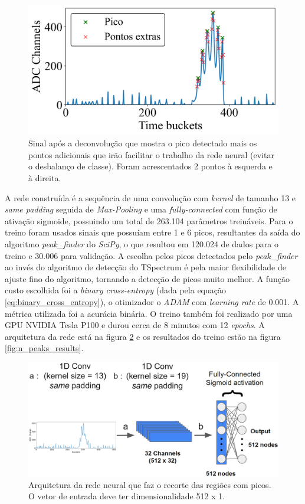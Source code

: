 \documentclass[a4paper,12pt,oneside]{book}
\begin{document}
\begin{figure}[H]
    \centering
    \includegraphics[scale = 0.6]{figs/np_ex1.png}
    \caption{Sinal após a deconvolução que mostra o pico detectado mais os pontos adicionais que irão facilitar o trabalho da rede neural (evitar o desbalanço de classe). Foram acrescentados 2 pontos à esquerda e à direita.}
    \label{fig:n_peaks_exs}
\end{figure}

\par A rede construída é a sequência de uma convolução com \textit{kernel} de tamanho 13 e \textit{same padding} seguida de \textit{Max-Pooling} e uma \textit{fully-connected} com função de ativação sigmoide, possuindo um total de 263.104 parâmetros treináveis. Para o treino foram usados sinais que possuíam entre 1 e 6 picos, resultantes da saída do algoritmo \textit{peak\_finder} do \textit{SciPy}, o que resultou em 120.024 de dados para o treino e 30.006 para validação. A escolha pelos picos detectados pelo \textit{peak\_finder} ao invés do algoritmo de detecção do TSpectrum é pela maior flexibilidade de ajuste fino do algoritmo, tornando a detecção de picos muito melhor\cite{FORTINO2022166497}. A função custo escolhida foi a \textit{binary cross-entropy} (dada pela equação \ref{eq:binary_cross_entropy}), o otimizador o \textit{ADAM} com \textit{learning rate} de 0.001. A métrica utilizada foi a acurácia binária. O treino também foi realizado por uma GPU NVIDIA Tesla P100 e durou cerca de 8 minutos com 12 \textit{epochs}. A arquitetura da rede está na figura \ref{fig:arq:n_peaks} e os resultados do treino estão na figura \ref{fig:n_peaks_results}.

\begin{figure}[H]
    \centering
    \includegraphics[scale = 0.35]{figs/n_peaks.png}
    \caption{Arquitetura da rede neural que faz o recorte das regiões com picos. O vetor de entrada deve ter dimensionalidade 512 x 1.}
    \label{fig:arq:n_peaks}
\end{figure}
\end{document}
